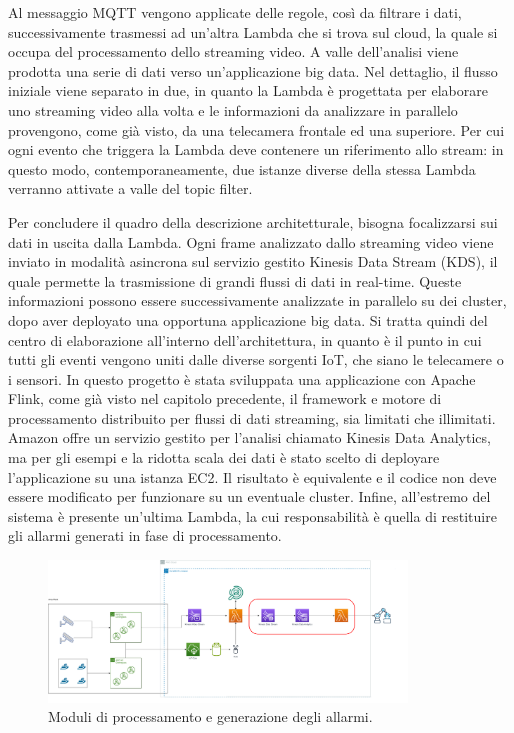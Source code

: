 Al messaggio MQTT vengono applicate delle regole, così da filtrare i dati, successivamente trasmessi ad un’altra Lambda che si trova sul cloud, la quale si occupa del processamento dello streaming video. A valle dell’analisi viene prodotta una serie di dati verso un’applicazione big data. Nel dettaglio, il flusso iniziale viene separato in due, in quanto la Lambda è progettata per elaborare uno streaming video alla volta e le informazioni da analizzare in parallelo provengono, come già visto, da una telecamera frontale ed una superiore. Per cui ogni evento che triggera la Lambda deve contenere un riferimento allo stream: in questo modo, contemporaneamente, due istanze diverse della stessa Lambda verranno attivate a valle del topic filter. 

Per concludere il quadro della descrizione architetturale, bisogna focalizzarsi sui dati in uscita dalla Lambda. Ogni frame analizzato dallo streaming video viene inviato in modalità asincrona sul servizio gestito Kinesis Data Stream (KDS), il quale permette la trasmissione di grandi flussi di dati in real-time. Queste informazioni possono essere successivamente analizzate in parallelo su dei cluster, dopo aver deployato una opportuna applicazione big data. Si tratta quindi del centro di elaborazione all'interno dell'architettura, in quanto è il punto in cui tutti gli eventi vengono uniti dalle diverse sorgenti IoT, che siano le telecamere o i sensori. In questo progetto è stata sviluppata una applicazione con Apache Flink, come già visto nel capitolo precedente, il framework e motore di processamento distribuito per flussi di dati streaming, sia limitati che illimitati. 
Amazon offre un servizio gestito per l’analisi chiamato Kinesis Data Analytics, ma per gli esempi e la ridotta scala dei dati è stato scelto di deployare l’applicazione su una istanza EC2. Il risultato è equivalente e il codice non deve essere modificato per funzionare su un eventuale cluster. Infine, all'estremo del sistema è presente un'ultima Lambda, la cui responsabilità è quella di restituire gli allarmi generati in fase di processamento. 

\begin{figure}[htbp]
    \centering
    \includegraphics[width=0.85\textwidth]{figures/processing-subsystem.png}
    \caption{Moduli di processamento e generazione degli allarmi.} 
    \label{fig:processing-subsystem}
\end{figure}

